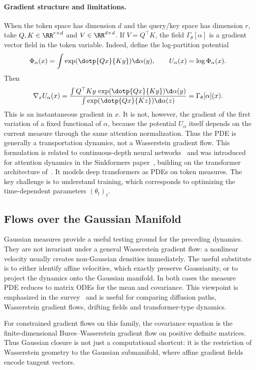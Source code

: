 \paragraph{Gradient structure and limitations.}

When the token space has dimension $d$ and the query/key space has dimension $r$, take $Q,K\in\RR^{r\times d}$ and $V\in\RR^{d\times d}$. If $V=Q^\top K$, the field $\Gamma_\theta[\alpha]$ is a gradient vector field in the token variable. Indeed, define the log-partition potential
\[
	\Phi_\alpha(x)
	=
	\int \exp(\dotp{Qx}{Ky})\d\alpha(y),
	\qquad
	U_\alpha(x)=\log\Phi_\alpha(x).
\]
Then
\[
	\nabla_x U_\alpha(x)
	=
	\frac{\int Q^\top K y\,\exp(\dotp{Qx}{Ky})\d\alpha(y)}
	     {\int \exp(\dotp{Qx}{Kz})\d\alpha(z)}
	=
	\Gamma_\theta[\alpha](x).
\]
This is an instantaneous gradient in $x$. It is not, however, the gradient of the first variation of a fixed functional of $\alpha$, because the potential $U_\alpha$ itself depends on the current measure through the same attention normalization. Thus the PDE is generally a transportation dynamics, not a Wasserstein gradient flow.
%
This formulation is related to continuous-depth neural networks~\cite{Chen2018NeuralODE} and was introduced for attention dynamics in the Sinkformers paper~\cite{Sander2022Sinkformers}, building on the transformer architecture of~\cite{Vaswani2017Attention}. It models deep transformers as PDEs on token measures. The key challenge is to understand training, which corresponds to optimizing the time-dependent parameters $(\theta_t)_t$.

\subsection{Flows over the Gaussian Manifold}

Gaussian measures provide a useful testing ground for the preceding dynamics. They are not invariant under a general Wasserstein gradient flow: a nonlinear velocity usually creates non-Gaussian densities immediately. The useful substitute is to either identify affine velocities, which exactly preserve Gaussianity, or to project the dynamics onto the Gaussian manifold. In both cases the measure PDE reduces to matrix ODEs for the mean and covariance. This viewpoint is emphasized in the survey~\cite{Peyre2026OptimalDiffusionTransports} and is useful for comparing diffusion paths, Wasserstein gradient flows, drifting fields and transformer-type dynamics.

For constrained gradient flows on this family, the covariance equation is the finite-dimensional Bures--Wasserstein gradient flow on positive definite matrices. Thus Gaussian closure is not just a computational shortcut: it is the restriction of Wasserstein geometry to the Gaussian submanifold, where affine gradient fields encode tangent vectors.

